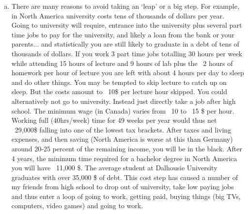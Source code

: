\begin{enumerate}[a)]
\item There are many reasons to avoid taking an `leap' or a big step. For example, in North America university costs tens of thousands of dollars per year. Going to university will require, entrance into the university plus several part time jobs to pay for the university, and likely a loan from the bank or your parents... and statistically you are still likely to graduate in a debt of tens of thousands of dollars. If you work 3 part time jobs totalling 30 hours per week while attending 15 hours of lecture  and 9 hours of lab plus the ~2 hours of homework per hour of lecture you are left with about 4 hours per day to sleep and do other things. You may be tempted to skip lecture to catch up on sleep. But the costs amount to ~10\$ per lecture hour skipped. You could alternatively not go to university. Instead just directly take a job after high school. The minimum wage (in Canada) varies from ~10 to ~15 \$ per hour. Working full (40hrs/week) time for 49 weeks per year would thus net ~29,000\$ falling into one of the lowest tax brackets. After taxes and living expenses, and then saving (North America is worse at this than Germany) around 20-25 percent of the remaining income, you will be in the black. After 4 years, the minimum time required for a bachelor degree in North America you will have ~11,000 \$. The average student at Dalhousie University graduates with over 35,000 \$ of debt. This cost step has caused a number of my friends from high school to drop out of university, take low paying jobs and thus enter a loop of going to work, getting paid, buying things (big TVs, computers, video games) and going to work.   


\end{enumerate}

